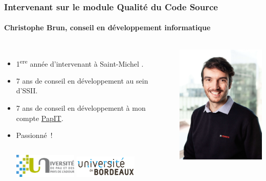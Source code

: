 \documentclass{beamer}
\begin{document}
    \begin{frame}
        \transdissolve
        \frametitle{Intervenant sur le module Qualité du Code Source}
        \framesubtitle{Christophe Brun, conseil en développement informatique}

        \begin{columns}
            \begin{itemize}
                \item 1\textsuperscript{ere} année d'intervenant à Saint-Michel .

                \item 7 ans de conseil en développement au sein d'SSII.

                \item 7 ans de conseil en développement à mon compte \href{https://papit.fr}{PapIT}.

                \item Passionné~!
                \bigbreak
                \begin{columns}
                    \centering
                    \includegraphics[width=3cm]{image/logo-uppa.png}
                    \centering
                    \includegraphics[width=3cm]{image/logo-universite-bordeaux.png}
                \end{columns}
            \end{itemize}
            \centering
            \includegraphics[width=5cm]{image/trombine-christophe.jpg}
        \end{columns}
    \end{frame}
\end{document}
